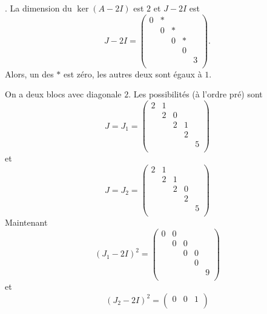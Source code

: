 \begin{example}. 
\label{exe:54}
  La dimension du $\ker(A - 2 I)$ est $2$ et $J - 2I$ est
  \begin{displaymath}
     J  - 2I =
  \begin{pmatrix}
    0 & *  \\
    & 0 & * \\
    & & 0 & * \\
    & & & 0   \\
    & & & & 3 \\
  \end{pmatrix}. 
\end{displaymath}
Alors, un des $*$ est zéro, les autres deux sont égaux à $1$.

On a deux blocs avec diagonale $2$. Les possibilités (à l'ordre pré) sont
\begin{displaymath}
J =   J_1 =  \begin{pmatrix}
    2 & 1  \\
    & 2 & 0 \\
    & & 2 & 1 \\
    & & & 2   \\
    & & & & 5 \\
  \end{pmatrix}
\end{displaymath}
et
\begin{displaymath}
J =   J_2 =  \begin{pmatrix}
    2 & 1  \\
    & 2 & 1 \\
    & & 2 & 0 \\
    & & & 2   \\
    & & & & 5 \\
  \end{pmatrix}
\end{displaymath}
Maintenant
\begin{displaymath}
  (J_1 - 2I)^2 =
  \begin{pmatrix}
     0 &0  \\
    & 0 & 0 \\
    & & 0 & 0 \\
    & & & 0   \\
    & & & & 9 \\
  \end{pmatrix}
\end{displaymath}
et
\begin{displaymath}
  (J_2 - 2I)^2 =
  \begin{pmatrix}
     0 &0 &1   \\

\end{pmatrix}
\end{displaymath}
\end{example}
